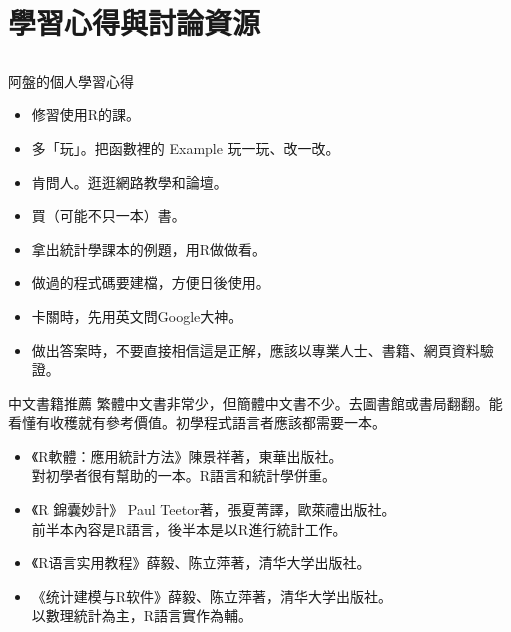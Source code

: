 \documentclass[14pt, aspectratio=43]{beamer}
\begin{document}
\section{學習心得與討論資源}\subsection{}

\begin{frame}{阿盤的個人學習心得}
\begin{itemize}
\item 修習使用R的課。
\item 多「玩」。把函數裡的 Example 玩一玩、改一改。
\item 肯問人。逛逛網路教學和論壇。
\item 買（可能不只一本）書。
\item 拿出統計學課本的例題，用R做做看。
\item 做過的程式碼要建檔，方便日後使用。
\item 卡關時，先用英文問Google大神。
\item 做出答案時，不要直接相信這是正解，應該以專業人士、書籍、網頁資料驗證。
\end{itemize}
\end{frame}


\begin{frame}{中文書籍推薦}
繁體中文書非常少，但簡體中文書不少。去圖書館或書局翻翻。能看懂有收穫就有參考價值。初學程式語言者應該都需要一本。
\begin{itemize}
\item 《R軟體：應用統計方法》陳景祥著，東華出版社。\\ 對初學者很有幫助的一本。R語言和統計學併重。
\item 《R 錦囊妙計》 Paul Teetor著，張夏菁譯，歐萊禮出版社。\\ 前半本內容是R語言，後半本是以R進行統計工作。
\item {《R语言实用教程》薛毅、陈立萍著，清华大学出版社。}
\item {《统计建模与R软件》薛毅、陈立萍著，清华大学出版社。} \\ 以數理統計為主，R語言實作為輔。
\end{itemize}
\end{frame}
\end{document}
